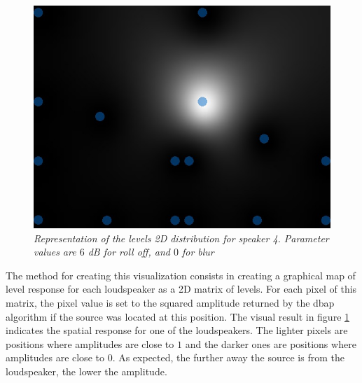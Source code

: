 \documentclass[twoside,10pt]{article}
\begin{document}
\begin{figure}[ht]
\centerline{\includegraphics[scale=0.5]{spk4_r_6_b_0}}
\caption{{\it Representation of the levels 2D distribution for speaker 4. Parameter values are $6$ dB for roll off, and $0$ for blur}}  
\label{fig:1spk}
\end{figure}


The method for creating this visualization consists in creating a graphical map of level response for each loudspeaker as a 2D matrix of levels. For each pixel of this matrix, the pixel value is set to the squared amplitude returned by the dbap algorithm if the source was located at this position. The visual result in figure \ref{fig:1spk} indicates the spatial response for one of the loudspeakers. The lighter pixels are positions where amplitudes are close to $1$ and the darker ones are positions where amplitudes are close to $0$. As expected, the further away the source is from the loudspeaker, the lower the amplitude. 

\end{document}
